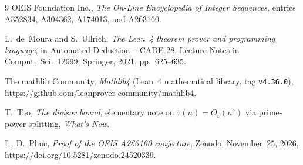 \documentclass[11pt,a4paper]{article}
\theoremstyle{definition}
\theoremstyle{remark}
\begin{document}
{\small
\begin{thebibliography}{9}
\setlength{\itemsep}{2pt}
OEIS Foundation Inc., \emph{The On-Line Encyclopedia of Integer Sequences}, entries \href{https://oeis.org/A352834}{A352834}, \href{https://oeis.org/A304362}{A304362}, \href{https://oeis.org/A174013}{A174013}, and \href{https://oeis.org/A263160}{A263160}.

L.~de~Moura and S.~Ullrich, \emph{The Lean~4 theorem prover and programming language}, in Automated Deduction -- CADE 28, Lecture Notes in Comput.\ Sci.~12699, Springer, 2021, pp.~625--635.

The mathlib Community, \emph{Mathlib4} (Lean~4 mathematical library, tag \texttt{v4.36.0}), \url{https://github.com/leanprover-community/mathlib4}.

T.~Tao, \emph{The divisor bound}, elementary note on $\tau(n) = O_\varepsilon(n^\varepsilon)$ via prime-power splitting, \emph{What's New}.

L.~D.~Phuc, \emph{Proof of the OEIS A263160 conjecture}, Zenodo, November~25, 2026, \url{https://doi.org/10.5281/zenodo.24520339}.
\end{thebibliography}
}
\end{document}
